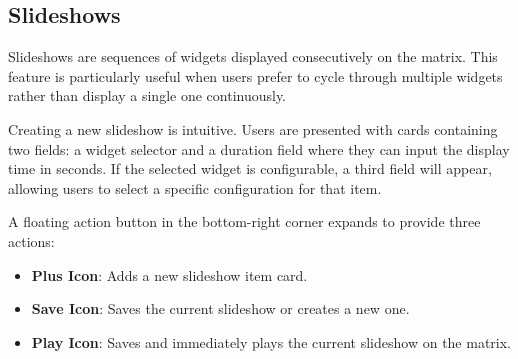 \subsection{Slideshows}
Slideshows are sequences of widgets displayed consecutively on the matrix. This feature is particularly useful when users prefer to cycle through multiple widgets rather than display a single one continuously.

Creating a new slideshow is intuitive. Users are presented with cards containing two fields: a widget selector and a duration field where they can input the display time in seconds. If the selected widget is configurable, a third field will appear, allowing users to select a specific configuration for that item.

A floating action button in the bottom-right corner expands to provide three actions:
\begin{itemize}
    \item \textbf{Plus Icon}: Adds a new slideshow item card.
    \item \textbf{Save Icon}: Saves the current slideshow or creates a new one.
    \item \textbf{Play Icon}: Saves and immediately plays the current slideshow on the matrix.
\end{itemize}

